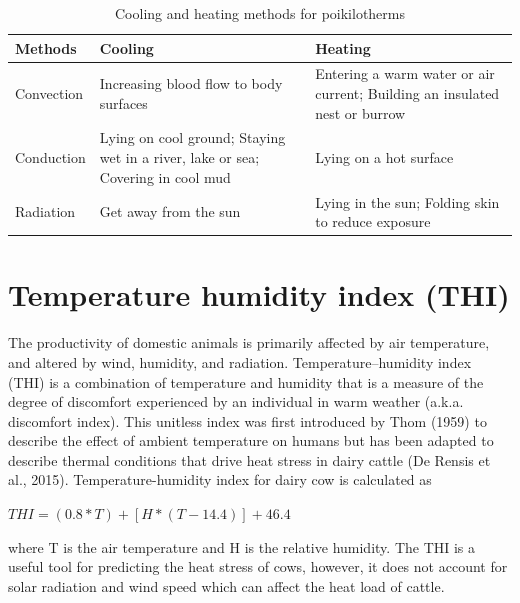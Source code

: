 \documentclass[]{book}
\begin{document}
\begin{table}[t]

\caption{\label{tab:cooling}Cooling and heating methods for poikilotherms}
\centering
\begin{tabular}{lll}
\toprule
Methods & Cooling & Heating\\
\midrule
Convection & Increasing blood flow to body surfaces & Entering a warm water or air current; Building an insulated nest or burrow\\
Conduction & Lying on cool ground; Staying wet in a river, lake or sea; Covering in cool mud & Lying on a hot surface\\
Radiation & Get away from the sun & Lying in the sun; Folding skin to reduce exposure\\
\bottomrule
\end{tabular}
\end{table}

\section{Temperature humidity index
(THI)}\label{temperature-humidity-index-thi}

The productivity of domestic animals is primarily affected by air
temperature, and altered by wind, humidity, and radiation.
Temperature--humidity index (THI) is a combination of temperature and
humidity that is a measure of the degree of discomfort experienced by an
individual in warm weather (a.k.a. discomfort index). This unitless
index was first introduced by Thom (1959) to describe the effect of
ambient temperature on humans but has been adapted to describe thermal
conditions that drive heat stress in dairy cattle (De Rensis et al.,
2015). Temperature-humidity index for dairy cow is calculated as

\(THI = (0.8*T) + [H*(T - 14.4)] + 46.4\)

where T is the air temperature and H is the relative humidity. The THI
is a useful tool for predicting the heat stress of cows, however, it
does not account for solar radiation and wind speed which can affect the
heat load of cattle.
\end{document}
